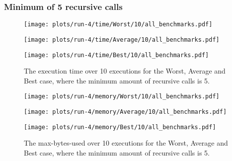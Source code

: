 \subsubsection{Minimum of 5 recursive calls}
\begin{figure}[H]
  \begin{minipage}{.5\textwidth}
    \centering
    \texttt{[image: plots/run-4/time/Worst/10/all\_benchmarks.pdf]}  
  \end{minipage}
  \begin{minipage}{.5\textwidth}
    \centering
    \texttt{[image: plots/run-4/time/Average/10/all\_benchmarks.pdf]}  
  \end{minipage}
  \begin{center}
    \begin{minipage}[c]{.5\textwidth}
      \centering
      \texttt{[image: plots/run-4/time/Best/10/all\_benchmarks.pdf]}  
    \end{minipage}
  \end{center}
  \caption{The execution time over 10 executions for the Worst, Average and Best case, where the minimum amount of recursive calls is 5.}
\end{figure}
\begin{figure}[H]
  \begin{minipage}{.5\textwidth}
    \centering
    \texttt{[image: plots/run-4/memory/Worst/10/all\_benchmarks.pdf]}  
  \end{minipage}
  \begin{minipage}{.5\textwidth}
    \centering
    \texttt{[image: plots/run-4/memory/Average/10/all\_benchmarks.pdf]}  
  \end{minipage}
  \begin{center}
    \begin{minipage}[c]{.5\textwidth}
      \centering
      \texttt{[image: plots/run-4/memory/Best/10/all\_benchmarks.pdf]}  
    \end{minipage}
  \end{center}
  \caption{The max-bytes-used over 10 executions for the Worst, Average and Best case, where the minimum amount of recursive calls is 5.}
\end{figure}

